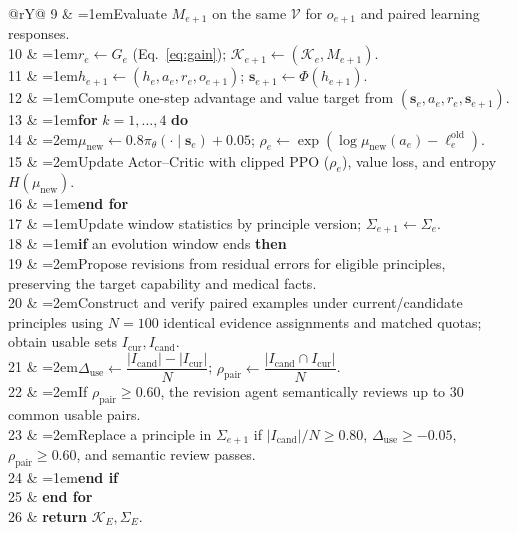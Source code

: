 \begin{algorithm}[H]
\begin{tabularx}{\linewidth}{@{}rY@{}}
9 & \hangindent=1em\quad Evaluate $M_{e+1}$ on the same $\mathcal V$ for $o_{e+1}$ and paired learning responses.\\
10 & \hangindent=1em\quad $r_e\leftarrow G_e$ (Eq.~\ref{eq:gain}); $\mathcal K_{e+1}\leftarrow(\mathcal K_e,M_{e+1})$.\\
11 & \hangindent=1em\quad $h_{e+1}\leftarrow(h_e,a_e,r_e,o_{e+1})$; $\mathbf{s}_{e+1}\leftarrow\Phi(h_{e+1})$.\\
12 & \hangindent=1em\quad Compute one-step advantage and value target from $(\mathbf{s}_e,a_e,r_e,\mathbf{s}_{e+1})$.\\
13 & \hangindent=1em\quad \textbf{for} $k=1,\ldots,4$ \textbf{do}\\
14 & \hangindent=2em\qquad $\mu_{\mathrm{new}}\leftarrow0.8\pi_\theta(\cdot\mid\mathbf{s}_e)+0.05$; $\rho_e\leftarrow\exp\!\left(\log\mu_{\mathrm{new}}(a_e)-\ell_e^{\mathrm{old}}\right)$.\\
15 & \hangindent=2em\qquad Update Actor--Critic with clipped PPO ($\rho_e$), value loss, and entropy $H(\mu_{\mathrm{new}})$.\\
16 & \hangindent=1em\quad \textbf{end for}\\
17 & \hangindent=1em\quad Update window statistics by principle version; $\Sigma_{e+1}\leftarrow\Sigma_e$.\\
18 & \hangindent=1em\quad \textbf{if} an evolution window ends \textbf{then}\\
19 & \hangindent=2em\qquad Propose revisions from residual errors for eligible principles, preserving the target capability and medical facts.\\
20 & \hangindent=2em\qquad Construct and verify paired examples under current/candidate principles using $N=100$ identical evidence assignments and matched quotas; obtain usable sets $I_{\mathrm{cur}},I_{\mathrm{cand}}$.\\
21 & \hangindent=2em\qquad $\Delta_{\mathrm{use}}\leftarrow\dfrac{|I_{\mathrm{cand}}|-|I_{\mathrm{cur}}|}{N}$; $\rho_{\mathrm{pair}}\leftarrow\dfrac{|I_{\mathrm{cand}}\cap I_{\mathrm{cur}}|}{N}$.\\
22 & \hangindent=2em\qquad If $\rho_{\mathrm{pair}}\geq0.60$, the revision agent semantically reviews up to 30 common usable pairs.\\
23 & \hangindent=2em\qquad Replace a principle in $\Sigma_{e+1}$ if $|I_{\mathrm{cand}}|/N\geq0.80$, $\Delta_{\mathrm{use}}\geq-0.05$, $\rho_{\mathrm{pair}}\geq0.60$, and semantic review passes.\\
24 & \hangindent=1em\quad \textbf{end if}\\
25 & \textbf{end for}\\
26 & \textbf{return} $\mathcal K_E,\Sigma_E$.\\
\bottomrule
\end{tabularx}
\caption{CoEvoMed: supervision construction driven by learning responses.}
\label{alg:coevomed}
\end{algorithm}

